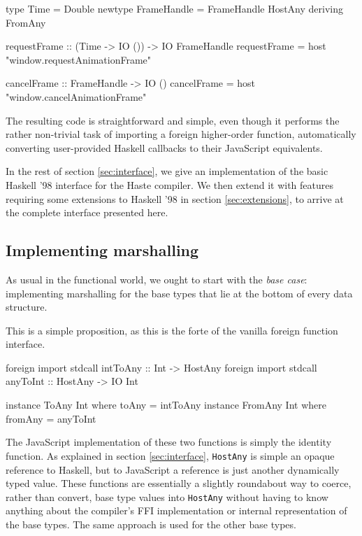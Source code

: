 \documentclass{sigplanconf}
\begin{document}
\begin{code}
type Time = Double
newtype FrameHandle = FrameHandle HostAny
  deriving FromAny

requestFrame :: (Time -> IO ()) -> IO FrameHandle
requestFrame = host "window.requestAnimationFrame"

cancelFrame :: FrameHandle -> IO ()
cancelFrame = host "window.cancelAnimationFrame"
\end{code}

The resulting code is straightforward and simple, even though it performs
the rather non-trivial task of importing a foreign higher-order function,
automatically converting user-provided Haskell callbacks to their JavaScript
equivalents.

In the rest of section \ref{sec:interface}, we give an implementation of the
basic Haskell '98 interface for the Haste compiler.
We then extend it with features requiring some extensions to Haskell '98
in section \ref{sec:extensions}, to arrive at the complete interface
presented here.

\subsection{Implementing marshalling}\label{sec:marshalling}
As usual in the functional world, we ought to start with the \emph{base case}:
implementing marshalling for the base types that lie at the bottom of every
data structure.

This is a simple proposition, as this is the forte of the vanilla foreign
function interface.

\begin{code}
foreign import stdcall intToAny :: Int -> HostAny
foreign import stdcall anyToInt :: HostAny -> IO Int

instance ToAny   Int where toAny   = intToAny
instance FromAny Int where fromAny = anyToInt
\end{code}

The JavaScript implementation of these two functions is simply the identity
function. As explained in section \ref{sec:interface}, \lstinline!HostAny! is
simple an opaque reference to Haskell, but to JavaScript a reference is just
another dynamically typed value. These functions are essentially a slightly
roundabout way to coerce, rather than convert, base type values into
\lstinline!HostAny! without having to know anything about the compiler's FFI
implementation or internal representation of the base types.
The same approach is used for the other base types.
\end{document}
